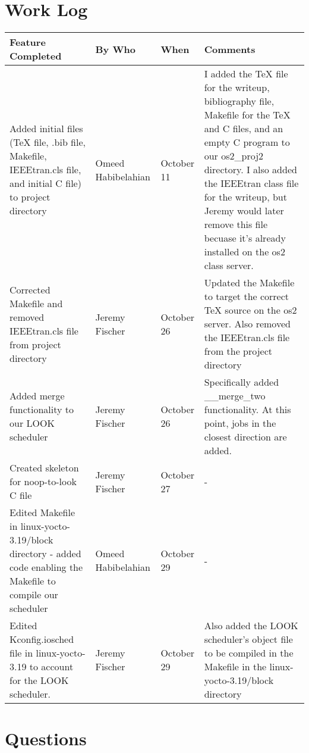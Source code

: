 \documentclass[draftclsnofoot, onecolumn, 10pt, compsoc]{IEEEtran}
\begin{document}
	\section{Work Log}
		\begin{tabular}{| p{4cm} | p{3cm} | p{2cm} | p{8cm} |}
			\hline
			Feature Completed & By Who & When & Comments \\ \hline
			
			Added initial files (TeX file, .bib file, Makefile, IEEEtran.cls file, and initial C file) to project directory
			& Omeed Habibelahian
			& October 11
			& I added the TeX file for the writeup, bibliography file, Makefile for the TeX and C files, and an empty C 
			program to our os2\_proj2 directory. I also added the IEEEtran class file for the writeup, but Jeremy would later
			remove this file becuase it's already installed on the os2 class server.\\
			\hline
			
			Corrected Makefile and removed IEEEtran.cls file from project directory
			& Jeremy Fischer
			& October 26
			& Updated the Makefile to target the correct TeX source on the os2 server. Also removed the IEEEtran.cls file
			from the project directory \\
			\hline
			
			Added merge functionality to our LOOK scheduler
			& Jeremy Fischer
			& October 26
			& Specifically added \_\_merge\_two functionality. At this point, jobs in the closest direction are added. \\
			\hline
			
			Created skeleton for noop-to-look C file
			& Jeremy Fischer
			& October 27
			& - \\
			\hline
			
			Edited Makefile in linux-yocto-3.19/block directory - added code enabling the Makefile to compile our scheduler
			& Omeed Habibelahian
			& October 29
			& - \\
			\hline
			
			Edited Kconfig.iosched file in linux-yocto-3.19 to account for the LOOK scheduler.
			& Jeremy Fischer
			& October 29
			& Also added the LOOK scheduler's object file to be compiled in the Makefile in the linux-yocto-3.19/block directory \\
			\hline
			
			
		\end{tabular}	
	
	\section{Questions}
\end{document}

